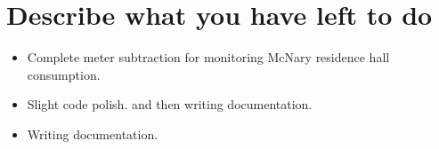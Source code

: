 \documentclass[letterpaper,10pt,serif,draftclsnofoot,onecolumn,compsoc,titlepage]{IEEEtran}
\begin{document}
\section{Describe what you have left to do}
\begin{itemize}
  \item Complete meter subtraction for monitoring McNary residence hall consumption.
  \item Slight code polish. and then writing documentation.
  \item Writing documentation.
\end{itemize}
\newpage
\cite{mongoose}


\end{document}
